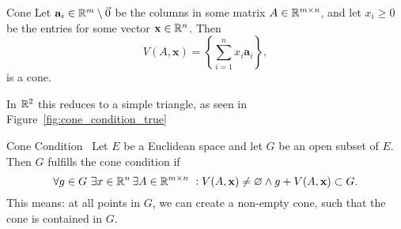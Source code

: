\begin{defn}{Cone}
Let $\mathbf{a}_i\in\mathbb{R}^m\setminus\vec{0}$ be the columns in some matrix 
$A\in \mathbb{R}^{m \times n}$, and let $x_i\geq 0$ be the entries for some vector $\mathbf{x}\in \mathbb{R}^n$.
 Then
\begin{equation*}
    V(A,\mathbf{x}) =\left \{ \sum_{i=1}^{n} x_i \mathbf{a}_i \right \},
\end{equation*}
is a cone. 
\end{defn}
In $\mathbb{R}^2$ this reduces to a simple triangle, as seen in Figure~\ref{fig:cone_condition_true}
\begin{defn}{Cone Condition}~\label{def:cone_condition}
    Let $E$ be a Euclidean space and let $G$ be an open subset of $E$.
    Then $G$ fulfills the cone condition if
    \begin{equation*}
        \forall g \in G\,\, \exists x\in \RR^n
        \, \exists A\in \RR^{m \times n} \,\, :
        V(A,\mathbf{x})\neq \varnothing \land
        g + V(A, \mathbf{x}) \subset G. %
    \end{equation*}
    This means: at all points in $G$, we can create a non-empty cone,
     such that the cone is contained 
    in $G$.
\end{defn}


